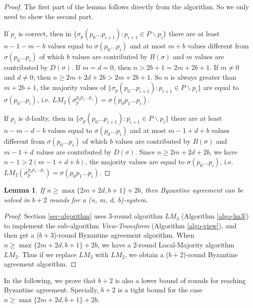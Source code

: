 \documentclass[11pt,conference,compsoc,onecolumn,romanappendices]{IEEEtran}
\newcommand{\tmem}[1]{{\em #1\/}}
\newtheorem{lemma}{Lemma}
\begin{document}
\begin{proof}
  The first part of the lemma follows directly from the algorithm.
  So we only need to show the second part.

  If $p_i$ is correct, then in $\{ \sigma_p (p_0 \ldots
  p_{i + 1}) : {p_{i + 1} \in P \backslash p_i} \}$ there are at least $n - 1 - m - b$
  values equal to $\sigma (p_0 \ldots p_i)$ and at most $m + b$ values
  different from $\sigma (p_0 \ldots p_i)$ of which $b$ values are contributed
  by $B (\sigma)$ and $m$ values are contributed by $D (\sigma)$.
  If $m  = d = 0$, then $n > 2b+1 = 2m+2b+1$. If $m \neq 0$ and $d \neq 0$,
  then $n \geqslant 2m + 2d +2b > 2m + 2b + 1$.
  So $n$ is always greater than
  $m + 2 b + 1$, the majority values of $\{ \sigma_p (p_0 \ldots
  p_{i + 1}) : {p_{i + 1} \in P \backslash p_i} \}$ are equal to $\sigma (p_0 \ldots p_i)$,
  i.e. $L M_2 (\sigma^{p_0 p_1 \ldots p_i}_{p}) = \sigma (p_0 p_1 \ldots p_i)$.
  
  If $p_i$ is d-faulty, then in $\{ \sigma_p (p_0 \ldots
  p_{i + 1}) : {p_{i + 1} \in P \backslash p_i} \}$ there are at least $n - m - d - b$
  values equal to $\sigma (p_0 \ldots p_i)$ and at most $m - 1 + d + b$ values
  different from $\sigma (p_0 \ldots p_i)$ of which $b$ values are contributed
  by $B (\sigma)$ and $m - 1 + d$ values are contributed by $D (\sigma)$.
  Since $n \geqslant 2 m + 2 d + 2 b$, we have $n - 1 > 2 (m - 1 + d + b)$,
  the majority values are equal to $\sigma (p_0 \ldots p_i)$,
  i.e. $L M_2 (\sigma^{p_0 p_1 \ldots p_i}_{p}) = \sigma (p_0 p_1 \ldots p_i)$.
\end{proof}

\begin{lemma}
  If $n \geqslant \max \{ 2 m + 2 d, b + 1 \} + 2 b$, then Byzantine agreement
  can be solved in $b + 2$ rounds for a (n, m, d, b)-system.
\end{lemma}

\begin{proof}
  Section \ref{sec-algorithm} uses $3$-round algorithm $L M_3$ 
  (Algorithm \ref{algo-lm3}) to implement the sub-algorithm
  \tmem{View-Transform} (Algorithm \ref{algo-view}), and then get a ($b+3$)-round Byzantine agreement
  algorithm. When $n \geqslant \max \{ 2 m + 2 d, b + 1 \} + 2 b$, we have a $2$-round
  Local-Majority algorithm $L M_2$. Thus if we replace $L M_3$ with $L M_2$, we 
  obtain a ($b+2$)-round Byzantine agreement algorithm.
\end{proof}

In the following, we prove that $b + 2$ is also a lower bound of rounds for reaching
Byzantine agreement. Specially, $b + 2$ is a tight bound for the case
$n \geqslant \max \{ 2 m + 2 d, b + 1 \} + 2 b$.
\end{document}
